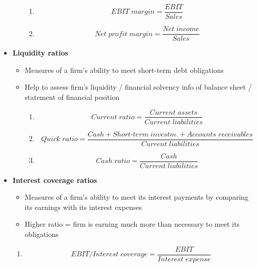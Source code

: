\documentclass[ieeetran]{article}
\begin{document}
\begin{itemize}
\begin{itemize}
\begin{enumerate}
			  \item 
			  \large
			  \begin{equation*}
			  \boxed{EBIT \; margin = \frac{EBIT}{Sales}}
			  \end{equation*}
			  \normalsize

			  \item 
			  \large
			  \begin{equation*}
			  \boxed{Net \; profit \; margin = \frac{Net \; income}{Sales}}
			  \end{equation*}
			  \normalsize
	  \end{enumerate}

	 \end{itemize}

\item \textbf{Liquidity ratios}
	\begin{itemize}
	  \item Measures of a firm's ability to meet short-term debt obligations
	  \item Help to assess firm's liquidity / financial solvency info of balance sheet / statement of financial position
	  \begin{enumerate}
	    	\item 
		\large
		\begin{equation*}
		\boxed{Current \; ratio = \frac{Current \; assets}{Current \; liabilities}}
		\end{equation*}
		\normalsize

	    	\item 
		\large
		\begin{equation*}
		\boxed{Quick \; ratio = \frac{Cash + Short\text{-}term \; investm. + Accounts \; receivables}{Current \; liabilities}}
		\end{equation*}
		\normalsize

	    	\item 
		\large
		\begin{equation*}
		\boxed{Cash \; ratio = \frac{Cash}{Current \; liabilities}}
		\end{equation*}
		\normalsize
	  \end{enumerate}
	\end{itemize}

\item \textbf{Interest coverage ratios}
	\begin{itemize}
	  \item Measures of a firm's ability to meet its interest payments by comparing its earnings with its interest expenses
	  \item Higher ratio = firm is earning much more than necessary to meet its obligations
	\end{itemize}
	  \begin{enumerate}
	    \item
	    \large
	    \begin{equation*}
	    \boxed{EBIT/Interest \; coverage = \frac{EBIT}{Interest \; expense}}
	    \end{equation*}
	    \normalsize


\end{enumerate}
\end{itemize}
\end{document}
